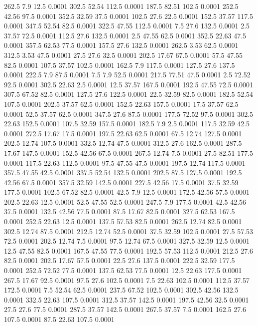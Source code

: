 262.5	7.9	12.5	0.0001
302.5	52.54	112.5	0.0001
187.5	82.51	102.5	0.0001
252.5	42.56	97.5	0.0001
352.5	32.59	37.5	0.0001
102.5	27.6	22.5	0.0001
152.5	37.57	117.5	0.0001
347.5	52.54	82.5	0.0001
322.5	47.55	112.5	0.0001
7.5	27.6	132.5	0.0001
2.5	37.57	72.5	0.0001
112.5	27.6	132.5	0.0001
2.5	47.55	62.5	0.0001
352.5	22.63	47.5	0.0001
357.5	62.53	77.5	0.0001
157.5	27.6	132.5	0.0001
262.5	3.53	62.5	0.0001
312.5	3.53	47.5	0.0001
27.5	27.6	32.5	0.0001
202.5	17.67	67.5	0.0001
57.5	47.55	82.5	0.0001
107.5	37.57	102.5	0.0001
162.5	7.9	117.5	0.0001
127.5	27.6	137.5	0.0001
222.5	7.9	87.5	0.0001
7.5	7.9	52.5	0.0001
217.5	77.51	47.5	0.0001
2.5	72.52	92.5	0.0001
302.5	22.63	2.5	0.0001
12.5	37.57	167.5	0.0001
192.5	47.55	72.5	0.0001
307.5	67.52	82.5	0.0001
127.5	27.6	122.5	0.0001
22.5	32.59	82.5	0.0001
182.5	52.54	107.5	0.0001
202.5	37.57	62.5	0.0001
152.5	22.63	157.5	0.0001
17.5	37.57	62.5	0.0001
52.5	37.57	62.5	0.0001
347.5	27.6	87.5	0.0001
177.5	72.52	97.5	0.0001
302.5	22.63	152.5	0.0001
107.5	32.59	157.5	0.0001
182.5	7.9	2.5	0.0001
117.5	32.59	42.5	0.0001
272.5	17.67	17.5	0.0001
197.5	22.63	62.5	0.0001
67.5	12.74	127.5	0.0001
202.5	12.74	107.5	0.0001
332.5	12.74	47.5	0.0001
312.5	27.6	162.5	0.0001
287.5	17.67	147.5	0.0001
152.5	42.56	67.5	0.0001
267.5	12.74	7.5	0.0001
27.5	82.51	177.5	0.0001
117.5	22.63	112.5	0.0001
97.5	47.55	47.5	0.0001
197.5	12.74	117.5	0.0001
357.5	47.55	42.5	0.0001
337.5	52.54	132.5	0.0001
202.5	87.5	127.5	0.0001
192.5	42.56	67.5	0.0001
357.5	32.59	142.5	0.0001
227.5	42.56	17.5	0.0001
37.5	32.59	177.5	0.0001
102.5	67.52	82.5	0.0001
42.5	7.9	12.5	0.0001
172.5	42.56	57.5	0.0001
202.5	22.63	12.5	0.0001
52.5	47.55	52.5	0.0001
247.5	7.9	177.5	0.0001
42.5	42.56	37.5	0.0001
132.5	42.56	77.5	0.0001
87.5	17.67	82.5	0.0001
327.5	62.53	167.5	0.0001
252.5	22.63	12.5	0.0001
137.5	57.53	82.5	0.0001
262.5	12.74	82.5	0.0001
302.5	12.74	87.5	0.0001
212.5	12.74	52.5	0.0001
37.5	32.59	102.5	0.0001
27.5	57.53	72.5	0.0001
202.5	12.74	7.5	0.0001
97.5	12.74	67.5	0.0001
327.5	32.59	12.5	0.0001
12.5	47.55	82.5	0.0001
167.5	47.55	77.5	0.0001
192.5	57.53	112.5	0.0001
212.5	27.6	82.5	0.0001
202.5	17.67	57.5	0.0001
22.5	27.6	137.5	0.0001
222.5	32.59	177.5	0.0001
252.5	72.52	77.5	0.0001
137.5	62.53	77.5	0.0001
12.5	22.63	177.5	0.0001
267.5	17.67	92.5	0.0001
97.5	27.6	102.5	0.0001
7.5	22.63	102.5	0.0001
112.5	37.57	172.5	0.0001
7.5	52.54	62.5	0.0001
237.5	67.52	102.5	0.0001
302.5	42.56	132.5	0.0001
332.5	22.63	107.5	0.0001
312.5	37.57	142.5	0.0001
197.5	42.56	32.5	0.0001
27.5	27.6	77.5	0.0001
287.5	37.57	142.5	0.0001
267.5	37.57	7.5	0.0001
162.5	27.6	107.5	0.0001
87.5	22.63	107.5	0.0001
